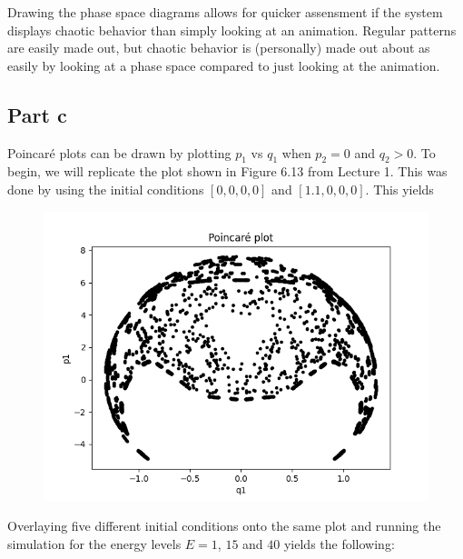 \documentclass[a4paper,12pt]{article}
\begin{document}
Drawing the phase space diagrams allows for quicker assensment if the system displays chaotic behavior than simply looking
at an animation. Regular patterns are easily made out, but chaotic behavior is (personally) made out about as easily by
looking at a phase space compared to just looking at the animation.

\subsection*{Part c}

Poincaré plots can be drawn by plotting $p_1$ vs $q_1$ when $p_2 = 0$ and $q_2 > 0$. To begin, we will replicate the plot shown
in Figure 6.13 from Lecture 1. This was done by using the initial conditions $[0, 0, 0, 0]$ and $[1.1, 0, 0, 0]$. This yields

\begin{figure}[!ht]
  \centering
  \includegraphics[scale=0.6]{img/replica.png}
\end{figure}

Overlaying five different initial conditions onto the same plot and running the simulation for the energy levels $E = 1$,
$15$ and $40$ yields the following:
\end{document}
